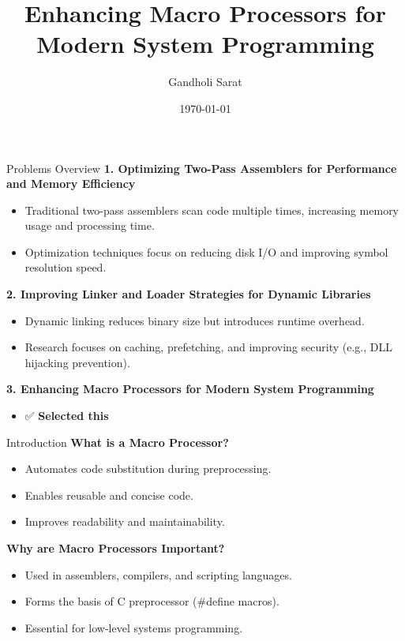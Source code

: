 \documentclass{beamer}
\title{Enhancing Macro Processors for Modern System Programming}
\author{Gandholi Sarat}
\date{\today}
\begin{document}
\frame{\titlepage}

\begin{frame}{Problems Overview}
    \textbf{1. Optimizing Two-Pass Assemblers for Performance and Memory Efficiency}
    \begin{itemize}
        \item Traditional two-pass assemblers scan code multiple times, increasing memory usage and processing time.
        \item Optimization techniques focus on reducing disk I/O and improving symbol resolution speed.
    \end{itemize}
    \vspace{0.3cm}
    \textbf{2. Improving Linker and Loader Strategies for Dynamic Libraries}
    \begin{itemize}
        \item Dynamic linking reduces binary size but introduces runtime overhead.
        \item Research focuses on caching, prefetching, and improving security (e.g., DLL hijacking prevention).
    \end{itemize}
    \vspace{0.3cm}
    \textbf{3. Enhancing Macro Processors for Modern System Programming}
    \begin{itemize}
        \item ✅ \textbf{Selected this }
    \end{itemize}
\end{frame}

\begin{frame}{Introduction}
    \textbf{What is a Macro Processor?}
    \begin{itemize}
        \item Automates code substitution during preprocessing.
        \item Enables reusable and concise code.
        \item Improves readability and maintainability.
    \end{itemize}
    \textbf{Why are Macro Processors Important?}
    \begin{itemize}
        \item Used in assemblers, compilers, and scripting languages.
        \item Forms the basis of C preprocessor (\#define macros).
        \item Essential for low-level systems programming.
    \end{itemize}
\end{frame}
\end{document}
